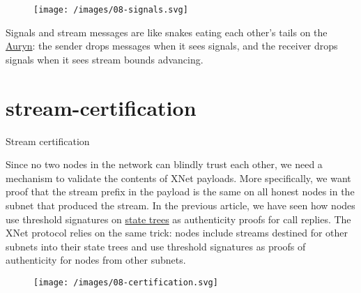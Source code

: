 \documentclass{article}
\begin{document}
\begin{figure}[grayscale-diagram]
  \texttt{[image: /images/08-signals.svg]}
\end{figure}

Signals and stream messages are like snakes eating each other's tails on the \href{https://theneverendingstory.fandom.com/wiki/Auryn}{Auryn}: the sender drops messages when it sees signals, and the receiver drops signals when it sees stream bounds advancing.

\section{stream-certification}{Stream certification}

Since no two nodes in the network can blindly trust each other, we need a mechanism to validate the contents of XNet payloads.
More specifically, we want proof that the stream prefix in the payload is the same on all honest nodes in the subnet that produced the stream.
In the previous article, we have seen how nodes use threshold signatures on \href{/posts/02-ic-state-machine-replication.html#state-trees}{state trees} as authenticity proofs for call replies.
The XNet protocol relies on the same trick: nodes include streams destined for other subnets into their state trees and use threshold signatures as proofs of authenticity for nodes from other subnets.

\begin{figure}[grayscale-diagram]
  \texttt{[image: /images/08-certification.svg]}
\end{figure}
\end{document}
